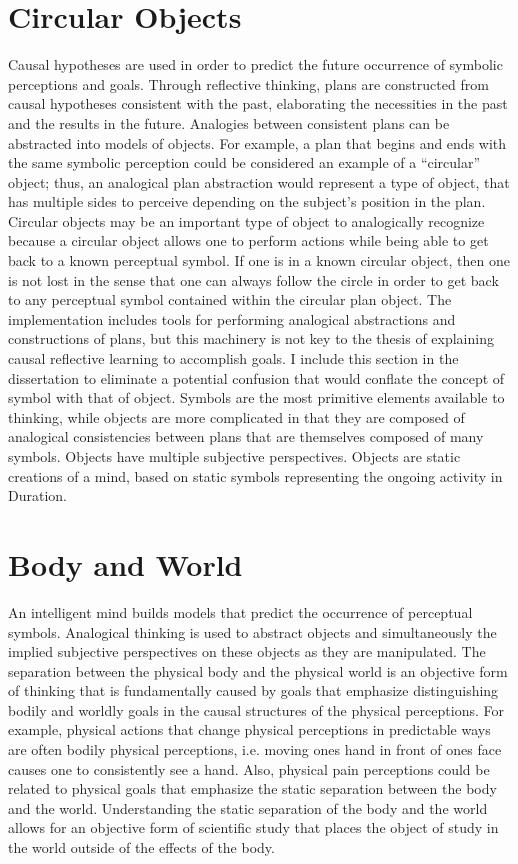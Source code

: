 \section{Circular Objects}

Causal hypotheses are used in order to predict the future occurrence
of symbolic perceptions and goals.  Through reflective thinking, plans
are constructed from causal hypotheses consistent with the past,
elaborating the necessities in the past and the results in the future.
Analogies between consistent plans can be abstracted into models of
objects.  For example, a plan that begins and ends with the same
symbolic perception could be considered an example of a ``circular''
object; thus, an analogical plan abstraction would represent a type of
object, that has multiple sides to perceive depending on the subject's
position in the plan.  Circular objects may be an important type of
object to analogically recognize because a circular object allows one
to perform actions while being able to get back to a known perceptual
symbol.  If one is in a known circular object, then one is not lost in
the sense that one can always follow the circle in order to get back
to any perceptual symbol contained within the circular plan object.
The implementation includes tools for performing analogical
abstractions and constructions of plans, but this machinery is not key
to the thesis of explaining causal reflective learning to accomplish
goals.  I include this section in the dissertation to eliminate a
potential confusion that would conflate the concept of symbol with
that of object.  Symbols are the most primitive elements available to
thinking, while objects are more complicated in that they are composed
of analogical consistencies between plans that are themselves composed
of many symbols.  Objects have multiple subjective perspectives.
Objects are static creations of a mind, based on static symbols
representing the ongoing activity in Duration.

\section{Body and World}

An intelligent mind builds models that predict the occurrence of
perceptual symbols.  Analogical thinking is used to abstract objects
and simultaneously the implied subjective perspectives on these
objects as they are manipulated.  The separation between the physical
body and the physical world is an objective form of thinking that is
fundamentally caused by goals that emphasize distinguishing bodily and
worldly goals in the causal structures of the physical perceptions.
For example, physical actions that change physical perceptions in
predictable ways are often bodily physical perceptions, i.e. moving
ones hand in front of ones face causes one to consistently see a hand.
Also, physical pain perceptions could be related to physical goals
that emphasize the static separation between the body and the world.
Understanding the static separation of the body and the world allows
for an objective form of scientific study that places the object of
study in the world outside of the effects of the body.

